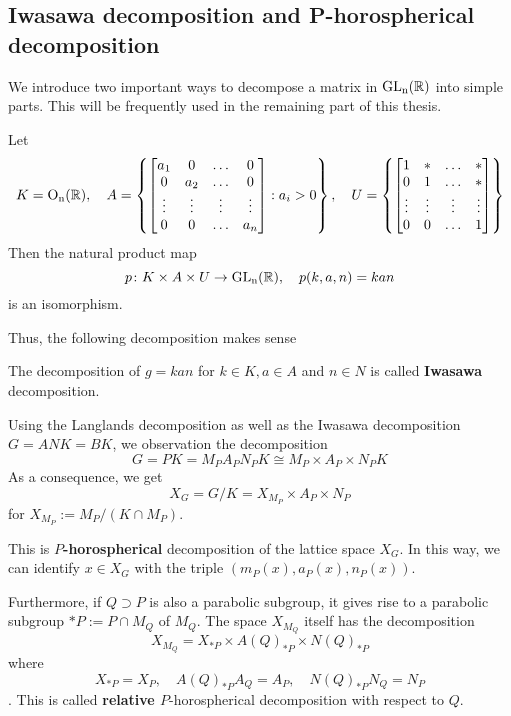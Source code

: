 \subsection{Iwasawa decomposition and P-horospherical decomposition}
We introduce two important ways to decompose a matrix in $\operatorname{\text{GL}_n(\mathbb{R})}$ into simple parts. This will be frequently used
in the remaining part of this thesis.
\begin{prop}
Let \begin{align*}
K=\operatorname{O_n(\mathbb{R})}, \quad A = \left\lbrace\begin{bmatrix}
    a_1    & 0      & \ldots & 0      \\
    0      & a_2    & \ldots & 0      \\
    \vdots & \vdots & \vdots & \vdots \\
    0      & 0      & \ldots & a_n
\end{bmatrix}: a_i >0\right\rbrace, \quad
U = \left\lbrace  \begin{bmatrix}
    1      & \ast   & \ldots & \ast           \\
    0      & 1      & \ldots & \ast           \\
    \vdots & \vdots & \vdots & \vdots         \\
    0      & 0      & \ldots & 1\end{bmatrix}
\right\rbrace
    \end{align*}
Then the natural product map \[p \colon K \times A \times U \to \operatorname{\text{GL}_n(\mathbb{R})}, \quad p(k,a,n)=kan\]
is an isomorphism.
\end{prop}
Thus, the following decomposition makes sense 
\begin{definition}
    The decomposition of $g = kan$ for $k \in K, a \in A$ and $n \in N$ is called \textbf{Iwasawa} decomposition.
\end{definition}
Using the Langlands decomposition as well as the Iwasawa decomposition $G= ANK = BK$, we observation
the decomposition
\[G = PK = M_PA_PN_PK \cong M_P \times A_P \times N_PK\]
As a consequence, we get
\[X_G  = G/K = X_{M_P} \times A_P \times N_P\]
for $X_{M_P} := M_{P}/(K\cap M_P)$. 

This is \textbf{$P$-horospherical} decomposition of the lattice space $X_G$. In this way,
we can identify  $x \in X_G$ with the triple $(m_P(x), a_P(x),n_P(x))$. 

Furthermore, if $Q\supset P$ is also a parabolic subgroup, it gives rise to a parabolic subgroup $\ast P := P \cap M_Q$ of $M_Q$.
The space $X_{M_Q}$ itself has the decomposition
\[X_{M_Q} = X_{\ast P} \times A(Q)_{\ast P} \times N(Q)_{\ast P}\]
where $$ X_{\ast P} = X_P, \quad A(Q)_{\ast P}A_Q=A_P, \quad N(Q)_{\ast P}N_Q=N_P$$. This is called \textbf{relative $P$}-horospherical decomposition with respect to $Q$.  
